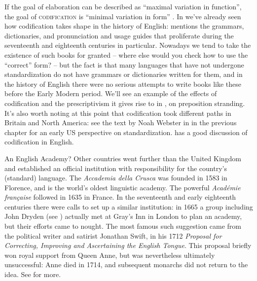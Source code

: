 If the goal of elaboration can be described as ``maximal variation in function'', the goal of \textsc{codification} is ``minimal variation in form'' \citep[931]{Haugen1966}. In  we've already seen how codification takes shape in the history of English:  mentions the grammars, dictionaries, and pronunciation and usage guides that proliferate during the seventeenth and eighteenth centuries in particular. Nowadays we tend to take the existence of such books for granted -- where else would you check how to use the ``correct'' form? -- but the fact is that many languages that have not undergone standardization do not have grammars or dictionaries written for them, and in the history of English there were no serious attempts to write books like these before the Early Modern period. We'll see an example of the effects of codification and the prescriptivism it gives rise to in , on preposition stranding. It's also worth noting at this point that codification took different paths in Britain and North America: see the text by Noah Webster in  in the previous chapter for an early US perspective on standardization. \citet[chapter 4]{Millar2012} has a good discussion of codification in English.


\begin{miscbox}{An English Academy?}
Other countries went further than the United Kingdom and established an official institution with responsibility for the country's (standard) language. The \textit{Accademia della Crusca} was founded in 1583 in Florence, and is the world's oldest linguistic academy. The powerful \textit{Académie française} followed in 1635 in France. In the seventeenth and early eighteenth centuries there were calls to set up a similar institution: in 1665 a group including John Dryden (see ) actually met at Gray's Inn in London to plan an academy, but their efforts came to nought. The most famous such suggestion came from the political writer and satirist Jonathan Swift, in his 1712 \textit{Proposal for Correcting, Improving and Ascertaining the English Tongue}. This proposal briefly won royal support from Queen Anne, but was nevertheless ultimately unsuccessful: Anne died in 1714, and subsequent monarchs did not return to the idea. See \citet[236--238]{MillHay2018} for more.
\end{miscbox}


